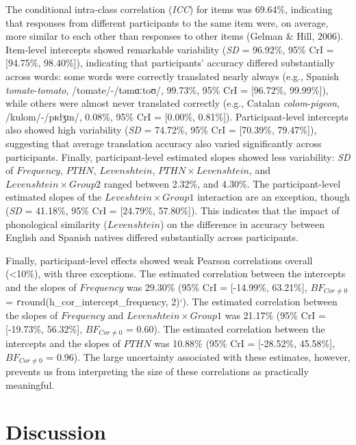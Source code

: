 \documentclass[
  english,
  man,floatsintext]{apa6}
\begin{document}
The conditional intra-class correlation (\emph{ICC}) for items was 69.64\%, indicating that responses from different participants to the same item were, on average, more similar to each other than responses to other items (Gelman \& Hill, 2006). Item-level intercepts showed remarkable variability (\emph{SD} = 96.92\%, 95\% CrI = {[}94.75\%, 98.40\%{]}), indicating that participants' accuracy differed substantially across words: some words were correctly translated nearly always (e.g., Spanish \emph{tomate}-\emph{tomato}, /tomate/-/təmɑːtoʊ/, 99.73\%, 95\% CrI = {[}96.72\%, 99.99\%{]}), while others were almost never translated correctly (e.g., Catalan \emph{colom}-\emph{pigeon}, /kulom/-/pɪdʒɪn/, 0.08\%, 95\% CrI = {[}0.00\%, 0.81\%{]}). Participant-level intercepts also showed high variability (\emph{SD} = 74.72\%, 95\% CrI = {[}70.39\%, 79.47\%{]}), suggesting that average translation accuracy also varied significantly across participants. Finally, participant-level estimated slopes showed less variability: \emph{SD} of \(Frequency\), \(PTHN\), \(Levenshtein\), \(PTHN \times Levenshtein\), and \(Levenshtein \times Group 2\) ranged between 2.32\%, and 4.30\%. The participant-level estimated slopes of the \(Leveshtein \times Group 1\) interaction are an exception, though (\emph{SD} = 41.18\%, 95\% CrI = {[}24.79\%, 57.80\%{]}). This indicates that the impact of phonological similarity (\(Levenshtein\)) on the difference in accuracy between English and Spanish natives differed substantially across participants.

Finally, participant-level effects showed weak Pearson correlations overall (\textless10\%), with three exceptions. The estimated correlation between the intercepts and the slopes of \(Frequency\) was 29.30\% (95\% CrI = {[}-14.99\%, 63.21\%{]}, \(BF_{Cor \neq 0}\) = \texttt{r}round(h\_cor\_intercept\_frequency, 2)`). The estimated correlation between the slopes of \(Frequency\) and \(Levenshtein \times Group 1\) was 21.17\% (95\% CrI = {[}-19.73\%, 56.32\%{]}, \(BF_{Cor \neq 0}\) = 0.60). The estimated correlation between the intercepts and the slopes of \(PTHN\) was 10.88\% (95\% CrI = {[}-28.52\%, 45.58\%{]}, \(BF_{Cor \neq 0}\) = 0.96). The large uncertainty associated with these estimates, however, prevents us from interpreting the size of these correlations as practically meaningful.

\hypertarget{discussion}{%
\section{Discussion}\label{discussion}}
\end{document}
